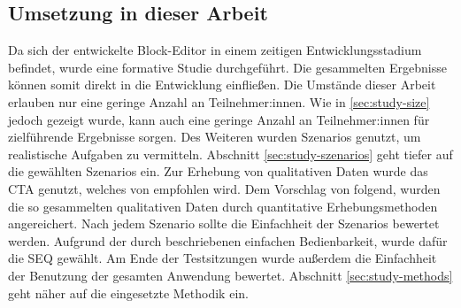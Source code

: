 \subsection{Umsetzung in dieser Arbeit}

Da sich der entwickelte Block-Editor in einem zeitigen Entwicklungsstadium befindet, wurde eine formative Studie durchgeführt. Die gesammelten Ergebnisse können somit direkt in die Entwicklung einfließen. Die Umstände dieser Arbeit erlauben nur eine geringe Anzahl an Teilnehmer:innen. Wie in \ref{sec:study-size} jedoch gezeigt wurde, kann auch eine geringe Anzahl an Teilnehmer:innen für zielführende Ergebnisse sorgen. Des Weiteren wurden Szenarios genutzt, um realistische Aufgaben zu vermitteln. Abschnitt \ref{sec:study-szenarios} geht tiefer auf die gewählten Szenarios ein. Zur Erhebung von qualitativen Daten wurde das \ac{CTA} genutzt, welches von \textcite{alhadretiRethinkingThinking2018} empfohlen wird. Dem Vorschlag von \textcite{barnumUsabilityTesting2021} folgend, wurden die so gesammelten qualitativen Daten durch quantitative Erhebungsmethoden angereichert. Nach jedem Szenario sollte die Einfachheit der Szenarios bewertet werden. Aufgrund der durch \textcite{sauroComparisonThree2009} beschriebenen einfachen Bedienbarkeit, wurde dafür die \ac{SEQ} gewählt. Am Ende der Testsitzungen wurde außerdem die Einfachheit der Benutzung der gesamten Anwendung bewertet. Abschnitt \ref{sec:study-methods} geht näher auf die eingesetzte Methodik ein.

